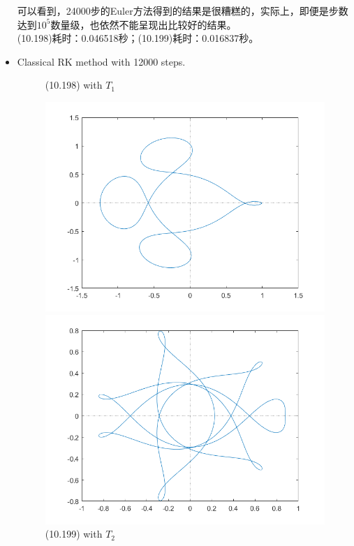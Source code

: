 \documentclass[a4paper,11.5pt,UTF8]{ctexart}
\begin{document}
\begin{large}
\begin{itemize}
\begin{figure}[H]
\begin{minipage}{0.48\textwidth}
    	    \end{minipage}
        \label{fig:1}
    \end{figure}
    可以看到，24000步的Euler方法得到的结果是很糟糕的，实际上，即便是步数达到$10^5$数量级，也依然不能呈现出比较好的结果。\\
    (10.198)耗时：0.046518秒；(10.199)耗时：0.016837秒。
    \item Classical RK method with 12000 steps.
    \begin{figure}[H]
        \centering
            \begin{minipage}{0.48\textwidth}
    	    \centering
    	    \caption{(10.198) with $T_1$}
    	    \includegraphics[scale=0.48]{./image/CRK_1.png}
    	    \end{minipage}
            \begin{minipage}{0.48\textwidth}
    	    \centering
    	    \caption{(10.199) with $T_2$}
    	    \includegraphics[scale=0.48]{./image/CRK_2.png}

\end{minipage}
\end{figure}
\end{itemize}
\end{large}
\end{document}
